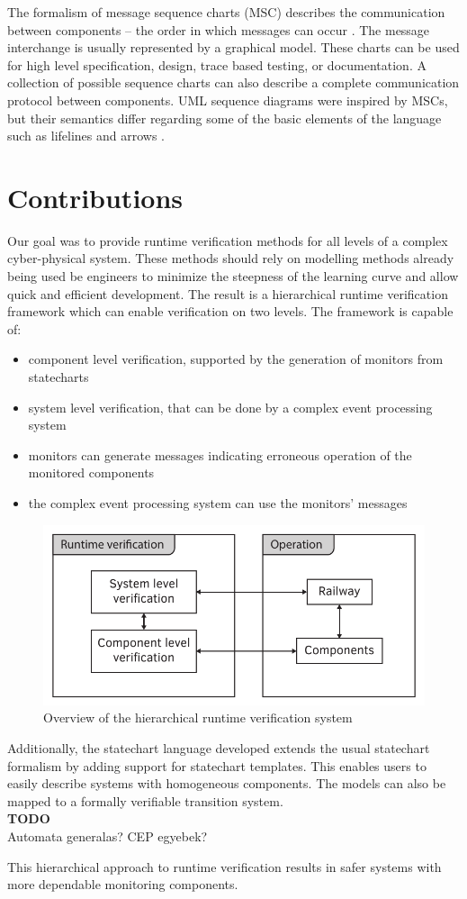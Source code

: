 The formalism of message sequence charts (MSC) describes the communication between components -- the order in which messages can occur \citep{msc} \citep{msc2}. The message interchange is usually represented by a graphical model. These charts can be used for high level specification, design, trace based testing, or documentation. A collection of possible sequence charts can also describe a complete communication protocol between components. UML sequence diagrams were inspired by MSCs, but their semantics differ regarding some of the basic elements of the language such as lifelines and arrows \citep{mscuml}.

\section*{Contributions}

Our goal was to provide runtime verification methods for all levels of a complex cyber-physical system. These methods should rely on modelling methods already being used be engineers to minimize the steepness of the learning curve and allow quick and efficient development. The result is a hierarchical runtime verification framework which can enable verification on two levels. The framework is capable of:
\begin{itemize}
  \item component level verification, supported by the generation of monitors from statecharts
  \item system level verification, that can be done by a complex event processing system
  \item monitors can generate messages indicating erroneous operation of the monitored components
  \item the complex event processing system can use the monitors' messages
\end{itemize}
\begin{figure}[h]
	\centering
	\includegraphics[width=0.5\linewidth]{include/figures/chapter_1/rv_concept}
	\caption{Overview of the hierarchical runtime verification system}
	\label{fig:case_study:fov}
\end{figure}
Additionally, the statechart language developed extends the usual statechart formalism by adding support for statechart templates. This enables users to easily describe systems with homogeneous components. The models can also be mapped to a formally verifiable transition system.
\\\textbf{TODO}\\
Automata generalas?
CEP egyebek?

This hierarchical approach to runtime verification results in safer systems with more dependable monitoring components.